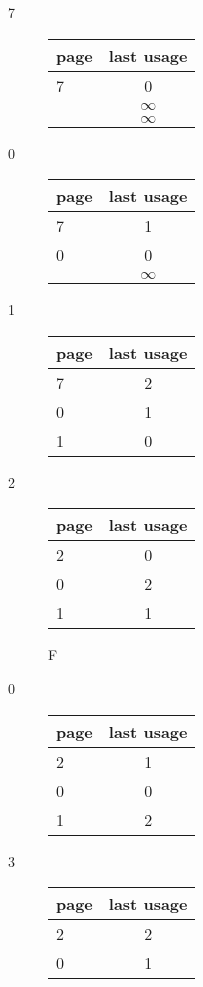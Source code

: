 \documentclass[12pt]{article}
\begin{document}
\begin{enumerate}[a]
\begin{multicols}{2}
		\begin{description}
			\item[7]
			\begin{tabular}{|p{2em}|c|}
				page & last usage\\
				\hline
				7 & 0\\
				\hline
				& $\infty$\\
				\hline
				& $\infty$\\
				\hline
			\end{tabular}
			\item[0]
			\begin{tabular}{|p{2em}|c|}
				page & last usage\\
				\hline
				7 & 1\\
				\hline
				0 & 0\\
				\hline
				& $\infty$\\
				\hline
			\end{tabular}
			\item[1]
			\begin{tabular}{|p{2em}|c|}
				page & last usage\\
				\hline
				7 & 2\\
				\hline
				0 & 1\\
				\hline
				1 & 0\\
				\hline
			\end{tabular}
			\item[2]
			\begin{tabular}{|p{2em}|c|}
				page & last usage\\
				\hline
				2 & 0\\
				\hline
				0 & 2\\
				\hline
				1 & 1\\
				\hline
			\end{tabular}
			F
			\item[0]
			\begin{tabular}{|p{2em}|c|}
				page & last usage\\
				\hline
				2 & 1\\
				\hline
				0 & 0\\
				\hline
				1 & 2\\
				\hline
			\end{tabular}
			\item[3]
			\begin{tabular}{|p{2em}|c|}
				page & last usage\\
				\hline
				2 & 2\\
				\hline
				0 & 1\\

\end{tabular}
\end{description}
\end{multicols}
\end{enumerate}
\end{document}

